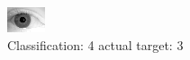 \begin{figure}[h!]
\begin{center}
\includegraphics[width=0.60\columnwidth]{figures/ID2174_class_4_target_3.png}
\end{center}
\caption{ Classification: 4 actual target: 3}
\label{fig:ID2174_class_4_target_3}
\end{figure}
